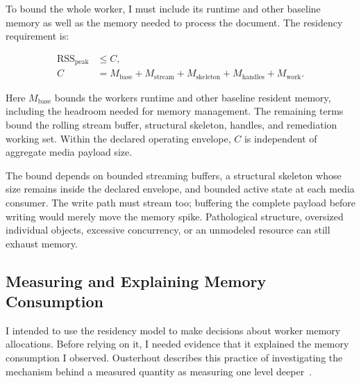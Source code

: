To bound the whole worker, I must include its runtime and other baseline memory as well as the memory needed to process the document. The residency requirement is:

\[
\begin{aligned}
\operatorname{RSS}_{\mathrm{peak}} &\le C,\\
C &= M_{\mathrm{base}} + M_{\mathrm{stream}} + M_{\mathrm{skeleton}}
   + M_{\mathrm{handles}} + M_{\mathrm{work}}.
\end{aligned}
\]

Here \(M_{\mathrm{base}}\) bounds the worker\textquotesingle s runtime and other baseline resident memory, including the headroom needed for memory management. The remaining terms bound the rolling stream buffer, structural skeleton, handles, and remediation working set. Within the declared operating envelope, \(C\) is independent of aggregate media payload size.

The bound depends on bounded streaming buffers, a structural skeleton whose size remains inside the declared envelope, and bounded active state at each media consumer. The write path must stream too; buffering the complete payload before writing would merely move the memory spike. Pathological structure, oversized individual objects, excessive concurrency, or an unmodeled resource can still exhaust memory.



\subsection{Measuring and Explaining Memory Consumption}\label{heading:why-one-level-deeper-matters}

I intended to use the residency model to make decisions about worker memory allocations. Before relying on it, I needed evidence that it explained the memory consumption I observed. Ousterhout describes this practice of investigating the mechanism behind a measured quantity as measuring one level deeper~\citep{ousterhout2018}.

